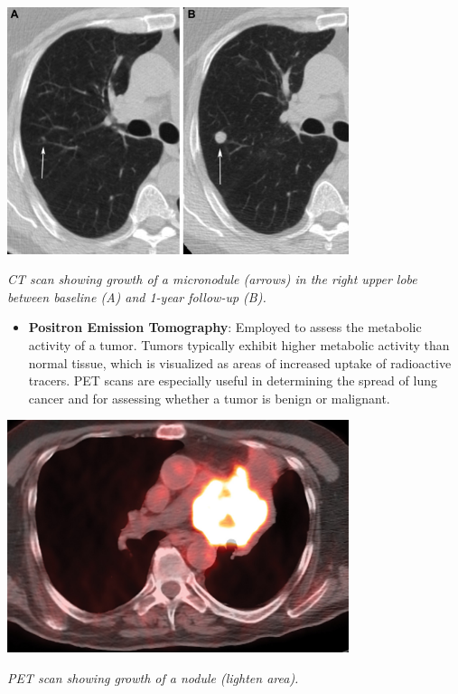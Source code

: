 \vspace{1em}
\begin{center}
    \includegraphics[width=0.75\textwidth]{../assets/04-diagnosis/lc-ct-micronodule-growth.jpg}

    \small\textit{CT scan showing growth of a micronodule (arrows) in the right upper lobe between 
    baseline (A) and 1-year follow-up (B). \cite{MUNDEN20191538}}
\end{center}
\vspace{1em}

\begin{itemize}
    \item \textbf{Positron Emission Tomography}: Employed to assess the metabolic activity of a 
    tumor. Tumors typically exhibit higher metabolic activity than normal tissue, which is 
    visualized as areas of increased uptake of radioactive tracers. PET scans are especially useful 
    in determining the spread of lung cancer and for assessing whether a tumor is benign or 
    malignant.
\end{itemize}

\vspace{1em}
\begin{center}
    \includegraphics[width=0.75\textwidth]{../assets/04-diagnosis/lc-pet.jpeg}

    \small\textit{PET scan showing growth of a nodule (lighten area). 
    \cite{doi:10.2214/AJR.16.16532}}
\end{center}
\vspace{1em}

